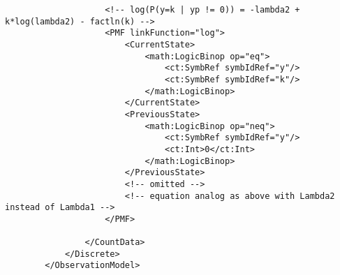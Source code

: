 \begin{lstlisting}
                    <!-- log(P(y=k | yp != 0)) = -lambda2 + k*log(lambda2) - factln(k) -->
                    <PMF linkFunction="log">
                        <CurrentState>
                            <math:LogicBinop op="eq">
                                <ct:SymbRef symbIdRef="y"/>
                                <ct:SymbRef symbIdRef="k"/>
                            </math:LogicBinop>                            
                        </CurrentState>
                        <PreviousState>
                            <math:LogicBinop op="neq">
                                <ct:SymbRef symbIdRef="y"/>
                                <ct:Int>0</ct:Int>
                            </math:LogicBinop>
                        </PreviousState>
                        <!-- omitted -->
                        <!-- equation analog as above with Lambda2 instead of Lambda1 --> 
                    </PMF>
                    
                </CountData>
            </Discrete>
        </ObservationModel>
\end{lstlisting}


